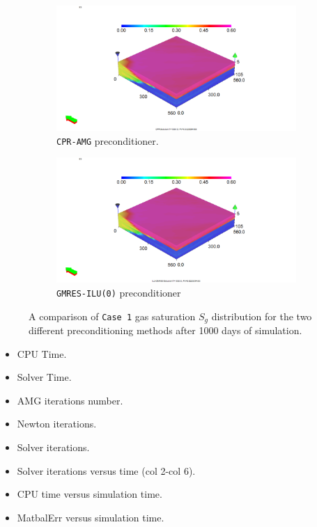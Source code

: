 \begin{figure}
\centering
\begin{subfigure}{.5\textwidth}
  \centering
  \includegraphics[width=1.3\linewidth]{figures/case1_cpr_sgas.png}
  \caption{\texttt{CPR-AMG} preconditioner.}
\end{subfigure}%
\begin{subfigure}{.5\textwidth}
  \centering
  \includegraphics[width=1.3\linewidth]{figures/case1_ilu_sgas.png}
  \caption{\texttt{GMRES-ILU(0)} preconditioner}
\end{subfigure}
\caption{A comparison of \texttt{Case 1} gas saturation $S_{g}$ distribution for the two different preconditioning methods after 1000 days of simulation.}
\label{case1sg}
\end{figure}

\begin{itemize}
	\item CPU Time.
	\item Solver Time.
	\item AMG iterations number.
	\item Newton iterations.
	\item Solver iterations.
	\item Solver iterations versus time (col 2-col 6).
	\item CPU time versus simulation time.
	\item MatbalErr versus simulation time.
\end{itemize}

